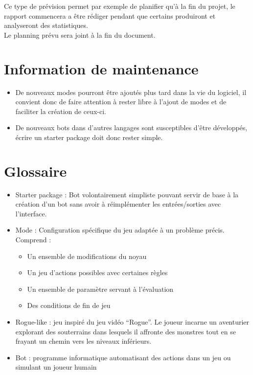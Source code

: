 \documentclass[12pt]{article}
\begin{document}
Ce type de prévision permet par exemple de planifier qu'à la fin du projet, le
rapport commencera a être rédiger pendant que certains produiront et analyseront
des statistiques.\\

Le planning prévu sera joint à la fin du document.


\section{Information de maintenance}

\begin{itemize}
\item De nouveaux modes pourront être ajoutés plus tard dans la vie du logiciel, il convient donc de faire attention à rester libre à l'ajout de modes et de faciliter la création de ceux-ci.
\item De nouveaux bots dans d'autres langages sont susceptibles d'être développés, écrire un starter package doit donc rester simple.
\end{itemize}

\section{Glossaire}

\begin{itemize}
	\item Starter package : Bot volontairement simpliste pouvant servir de base à la création d'un bot sans avoir à réimplémenter les entrées/sorties avec l'interface.
	\item Mode : Configuration spécifique du jeu adaptée à un problème précis. Comprend :
  	\begin{itemize}
		\item Un ensemble de modifications du noyau
		\item Un jeu d'actions possibles avec certaines règles
		\item Un ensemble de paramètre servant à l'évaluation
		\item Des conditions de fin de jeu
  	\end{itemize}
	\item Rogue-like : jeu inspiré du jeu vidéo ``Rogue''. Le joueur incarne un aventurier explorant des souterrains dans lesquels il affronte des monstres tout en se frayant un chemin vers les niveaux inférieurs.
	\item Bot : programme informatique automatisant des actions dans un jeu ou simulant un joueur humain
\end{itemize}
\end{document}
